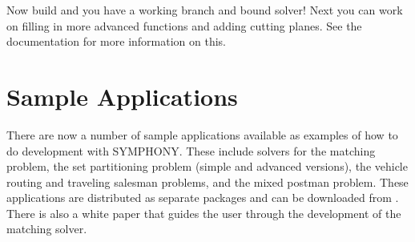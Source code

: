 Now build and you have a working branch and bound solver! Next you can
work on filling in more advanced functions and adding cutting planes. See the
documentation for more information on this.

\section{Sample Applications}

There are now a number of sample applications available as examples of how
to do development with SYMPHONY. These include solvers for the matching
problem, the set partitioning problem (simple and advanced versions), the 
vehicle routing and traveling salesman problems, and the mixed postman
problem. These applications are distributed as separate packages and can be
downloaded from       
\texttt{}. There is also a white paper that guides the
user through the development of the matching solver.
